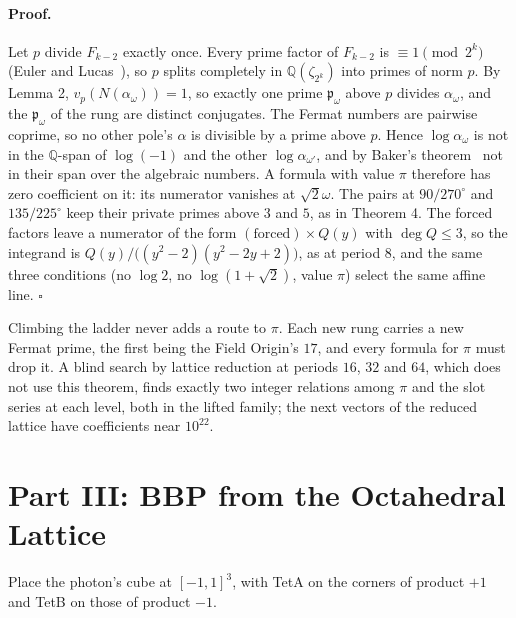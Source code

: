 \documentclass[twocolumn]{iopjournal}
\begin{document}
\paragraph{Proof.} Let $p$ divide $F_{k-2}$ exactly once. Every prime
factor of $F_{k-2}$ is $\equiv 1 \pmod{2^k}$ (Euler and
Lucas~\cite{Krizek2001}), so $p$ splits completely in
$\mathbb{Q}(\zeta_{2^k})$ into primes of norm $p$. By Lemma 2,
$v_p(N(\alpha_\omega)) = 1$, so exactly one prime $\mathfrak p_\omega$
above $p$ divides $\alpha_\omega$, and the $\mathfrak p_\omega$ of the
rung are distinct conjugates. The Fermat numbers are pairwise coprime,
so no other pole's $\alpha$ is divisible by a prime above $p$. Hence
$\log\alpha_\omega$ is not in the $\mathbb{Q}$-span of $\log(-1)$ and
the other $\log\alpha_{\omega'}$, and by Baker's
theorem~\cite{Baker1966} not in their span over the algebraic numbers.
A formula with value $\pi$ therefore has zero coefficient on it: its
numerator vanishes at $\sqrt2\omega$. The pairs at $90/270^\circ$ and
$135/225^\circ$ keep their private primes above $3$ and $5$, as in
Theorem 4. The forced factors leave a numerator of the form
$(\text{forced})\times Q(y)$ with $\deg Q \le 3$, so the integrand is
$Q(y)/\big((y^2-2)(y^2-2y+2)\big)$, as at period $8$, and the same
three conditions (no $\log 2$, no $\log(1+\sqrt2)$, value $\pi$)
select the same affine line. \hfill $\square$

\medskip
\noindent
Climbing the ladder never adds a route to $\pi$. Each new rung carries
a new Fermat prime, the first being the Field Origin's $17$, and every
formula for $\pi$ must drop it. A blind search by lattice reduction at
periods $16$, $32$ and $64$, which does not use this theorem, finds
exactly two integer relations among $\pi$ and the slot series at each
level, both in the lifted family; the next vectors of the reduced
lattice have coefficients near $10^{22}$.


\section*{Part III: BBP from the Octahedral Lattice}

Place the photon's cube at $[-1,1]^3$, with TetA on the corners of
product $+1$ and TetB on those of product $-1$.
\end{document}
